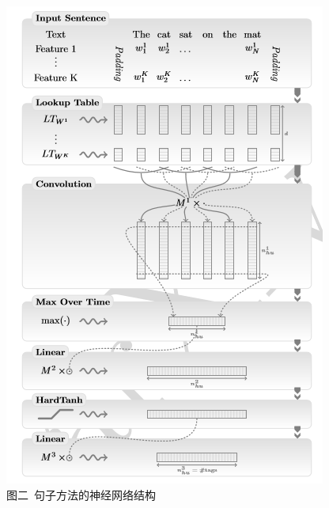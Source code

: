 \begin{figure}[!hbp]
\begin{center}
\includegraphics[width=\textwidth]{translations/f2.png}
\caption*{图二\ 句子方法的神经网络结构 \label{translation_f2}}
\end{center}
\end{figure}
